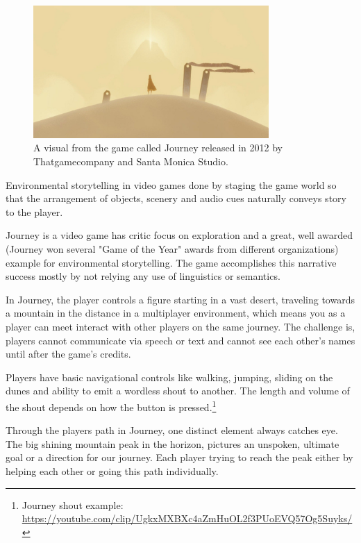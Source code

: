             \begin{figure}[H]
                \centering
                \includegraphics[width=0.8\textwidth]{images/journey.jpg}
                \caption{A visual from the game called Journey released in 2012 by Thatgamecompany and Santa Monica Studio.}
                \label{fig:JOURNEY}
            \end{figure}

            Environmental storytelling in video games done by staging the game world so that the arrangement of objects, scenery and audio cues naturally conveys story to the player\cite{BioShock_Infinite}.\par

            Journey is a video game has critic focus on exploration and a great, well awarded (Journey won several "Game of the Year" awards from different organizations) example for environmental storytelling. The game accomplishes this narrative success mostly by not relying any use of linguistics or semantics.\par

            In Journey, the player controls a figure starting in a vast desert, traveling towards a mountain in the distance in a multiplayer environment, which means you as a player can meet interact with other players on the same journey. The challenge is, players cannot communicate via speech or text and cannot see each other's names until after the game's credits.\par

            Players have basic navigational controls like walking, jumping, sliding on the dunes and ability to emit a wordless shout to another. The length and volume of the shout depends on how the button is pressed.\footnote{Journey shout example: \url{https://youtube.com/clip/UgkxMXBXc4aZmHuOL2f3PUoEVQ57Og5Suyks/}}\par

            Through the players path in Journey, one distinct element always catches eye. The big shining mountain peak in the horizon, pictures an unspoken, ultimate goal or a direction for our journey. Each player trying to reach the peak either by helping each other or going this path individually.\par

